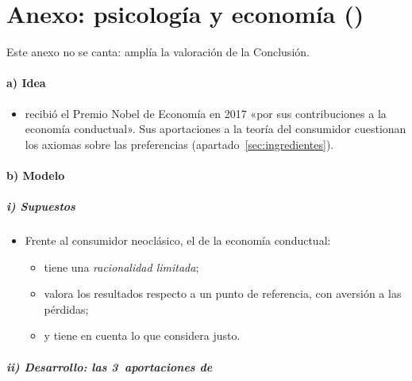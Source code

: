 \documentclass[11pt]{article}
\begin{document}
\section{Anexo: psicología y economía ()}\label{anexo:thaler}

\begin{notaopositor}
Este anexo no se canta: amplía la valoración de la Conclusión.
\end{notaopositor}

\paragraph{a) Idea}

\begin{itemize}
\item {} recibió el Premio Nobel de Economía en 2017 «por sus contribuciones a la economía conductual»\nocite{Nobel2017Thaler}. Sus aportaciones a la teoría del consumidor cuestionan los axiomas sobre las preferencias (apartado~\ref{sec:ingredientes}).
\end{itemize}

\paragraph{b) Modelo}

\subparagraph{i) Supuestos}

\begin{itemize}
\item Frente al consumidor neoclásico, el de la economía conductual:
  \begin{itemize}
  \item tiene una \emph{racionalidad limitada}\nocite{Simon1955Behavioral};
  \item valora los resultados respecto a un punto de referencia, con aversión a las pérdidas\nocite{KahnemanTversky1979Prospect};
  \item y tiene en cuenta lo que considera justo.
  \end{itemize}
\end{itemize}

\subparagraph{ii) Desarrollo: las 3~aportaciones de }
\end{document}

